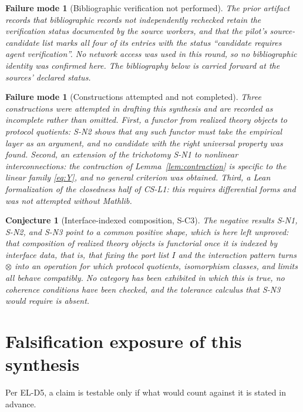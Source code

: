 \documentclass[11pt]{article}
\theoremstyle{plain}
\newtheorem{conjecture}[definition]{Conjecture}
\newtheorem{failuremode}[definition]{Failure mode}
\begin{document}
\begin{failuremode}[Bibliographic verification not performed]
The prior artifact records that bibliographic records not independently
rechecked retain the verification status documented by the source workers, and
that the pilot's source-candidate list marks all four of its entries with the
status ``candidate requires agent verification''. No network access was used in
this round, so no bibliographic identity was confirmed here. The bibliography
below is carried forward at the sources' declared status.
\end{failuremode}

\begin{failuremode}[Constructions attempted and not completed]
Three constructions were attempted in drafting this synthesis and are recorded
as incomplete rather than omitted. First, a functor from realized theory objects
to protocol quotients: S-N2 shows that any such functor must take the empirical
layer as an argument, and no candidate with the right universal property was
found. Second, an extension of the trichotomy S-N1 to nonlinear interconnections:
the contraction of Lemma~\ref{lem:contraction} is specific to the linear family
\eqref{eq:Y}, and no general criterion was obtained. Third, a Lean formalization
of the closedness half of CS-L1: this requires differential forms and was not
attempted without Mathlib.
\end{failuremode}

\begin{conjecture}[Interface-indexed composition, S-C3]
\label{conj:interface}
The negative results S-N1, S-N2, and S-N3 point to a common positive shape,
which is here left unproved: that composition of realized theory objects is
functorial once it is indexed by interface data, that is, that fixing the port
list $I$ and the interaction pattern turns $\otimes$ into an operation for which
protocol quotients, isomorphism classes, and limits all behave compatibly. No
category has been exhibited in which this is true, no coherence conditions have
been checked, and the tolerance calculus that S-N3 would require is absent.
\end{conjecture}

\section{Falsification exposure of this synthesis}
\label{sec:falsification}

Per EL-D5, a claim is testable only if what would count against it is stated in
advance.
\end{document}
